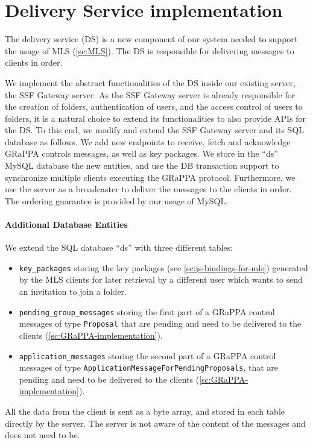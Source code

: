 \section{Delivery Service implementation}\label{ssc:delivery-service}

The delivery service (DS) is a new component of our system needed 
to support the usage of MLS (\cref{sc:MLS}).
The DS is responsible for delivering messages to clients in order.

We implement the abstract functionalities of the DS inside our existing server, the SSF Gateway
server. As the SSF Gateway server is already responsible for the creation of folders,
authentication of users, and the access control of users to folders, 
it is a natural choice to extend its functionalities to also provide APIs
for the DS.
To this end, we modify and extend the SSF Gateway server and its SQL database as follows.
We add new endpoints to receive, fetch and acknowledge
GRaPPA controls messages, as well as key packages.
We store in the ``ds'' MySQL database the new entities, and use the
DB transaction support to synchronize multiple clients executing
the GRaPPA protocol. Furthermore, we use the server as a broadcaster to
deliver the messages to the clients in order. The ordering guarantee
is provided by our usage of MySQL.

\paragraph{Additional Database Entities}
We extend the SQL database ``ds'' with three different tables:
\begin{itemize}
    \item \texttt{key\_packages} storing the key packages (see \cref{sc:js-bindings-for-mls}) generated by the MLS clients for later retrieval by a different user which wants to send an invitation to join a folder.
    \item \texttt{pending\_group\_messages} storing the first part of a GRaPPA control messages of type \texttt{Proposal} that are pending and need to be delivered to the clients (\cref{sc:GRaPPA-implementation}).
    \item \texttt{application\_messages} storing the second part of a GRaPPA control messages of type \texttt{ApplicationMessageForPendingProposals}, that are pending and need to be delivered to the clients (\cref{sc:GRaPPA-implementation}).
\end{itemize}

All the data from the client is sent as a byte array, and stored in each table
directly by the server. The server is not aware of the content of the messages
and does not need to be.

